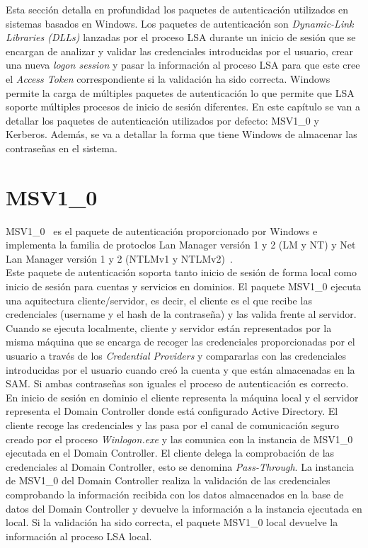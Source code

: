 Esta sección detalla en profundidad los paquetes de au\-ten\-ti\-ca\-ción utilizados en sistemas basados en Windows. Los paquetes de au\-ten\-ti\-ca\-ción son {\it Dynamic-Link Libraries (DLLs)} lanzadas por el proceso LSA durante un inicio de sesión que se encargan de analizar y validar las credenciales introducidas por el usuario, crear una nueva {\it logon session} y pasar la información al proceso LSA para que este cree el {\it Access Token} correspondiente si la va\-li\-da\-ción ha sido correcta. Windows permite la carga de múltiples paquetes de au\-ten\-ti\-ca\-ción lo que permite que LSA soporte múltiples procesos de inicio de sesión diferentes. En este capítulo se van a detallar los paquetes de au\-ten\-ti\-ca\-ción utilizados por defecto: MSV1\_0 y Kerberos. Además, se va a detallar la forma que tiene Windows de almacenar las contraseñas en el sistema.

\section{MSV1\_0}

MSV1\_0~\cite{Capitulo3:MSV10} es el paquete de au\-ten\-ti\-ca\-ción proporcionado por Windows e implementa la familia de protoclos Lan Manager versión 1 y 2 (LM y NT) y Net Lan Manager versión 1 y 2 (NTLMv1 y NTLMv2)~\cite{Capitulo3:NTLM}. \\

Este paquete de au\-ten\-ti\-ca\-ción soporta tanto inicio de sesión de forma local como inicio de sesión para cuentas y servicios en dominios. El paquete MSV1\_0 ejecuta una aquitectura cliente/servidor, es decir, el cliente es el que recibe las credenciales (username y el hash de la contraseña) y las valida frente al servidor. \\

Cuando se ejecuta localmente, cliente y servidor están representados por la misma máquina que se encarga de recoger las credenciales proporcionadas por el usuario a través de los {\it Credential Providers} y compararlas con las credenciales introducidas por el usuario cuando creó la cuenta y que están almacenadas en la SAM. Si ambas contraseñas son iguales el proceso de au\-ten\-ti\-ca\-ción es correcto. \\

En inicio de sesión en dominio el cliente representa la máquina local y el servidor representa el Domain Controller donde está configurado Active Directory. El cliente recoge las credenciales y las pasa por el canal de comunicación seguro creado por el proceso {\it Winlogon.exe} y las comunica con la instancia de MSV1\_0 ejecutada en el Domain Controller. El cliente delega la comprobación de las credenciales al Domain Controller, esto se denomina {\it Pass-Through}. La instancia de MSV1\_0 del Domain Controller realiza la validación de las credenciales comprobando la información recibida con los datos almacenados en la base de datos del Domain Controller y devuelve la información a la instancia ejecutada en local. Si la validación ha sido correcta, el paquete MSV1\_0 local devuelve la información al proceso LSA local. \\


